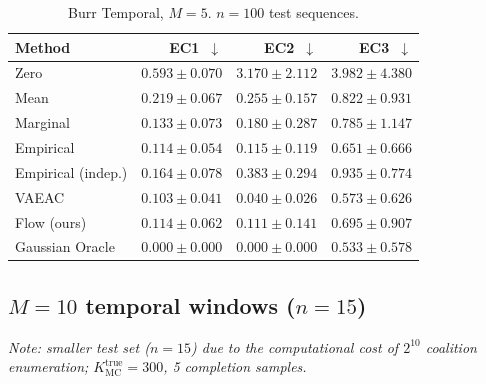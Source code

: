 \documentclass[11pt]{article}
\begin{document}
\begin{table}[h]
\centering
\caption{Burr Temporal, $M=5$. $n=100$ test sequences.}
\label{tab:burr_m5}
\begin{tabular}{lrrr}
\toprule
Method               & EC1~$\downarrow$           & EC2~$\downarrow$           & EC3~$\downarrow$ \\
\midrule
Zero                 & $0.593 \pm 0.070$          & $3.170 \pm 2.112$          & $3.982 \pm 4.380$ \\
Mean                 & $0.219 \pm 0.067$          & $0.255 \pm 0.157$          & $0.822 \pm 0.931$ \\
Marginal             & $0.133 \pm 0.073$          & $0.180 \pm 0.287$          & $0.785 \pm 1.147$ \\
Empirical            & $0.114 \pm 0.054$          & $0.115 \pm 0.119$          & $0.651 \pm 0.666$ \\
Empirical (indep.)   & $0.164 \pm 0.078$          & $0.383 \pm 0.294$          & $0.935 \pm 0.774$ \\
VAEAC                & $\mathbf{0.103 \pm 0.041}$ & $\mathbf{0.040 \pm 0.026}$ & $\mathbf{0.573 \pm 0.626}$ \\
Flow (ours)          & $0.114 \pm 0.062$          & $0.111 \pm 0.141$          & $0.695 \pm 0.907$ \\
\midrule
Gaussian Oracle      & $0.000 \pm 0.000$          & $0.000 \pm 0.000$          & $0.533 \pm 0.578$ \\
\bottomrule
\end{tabular}
\end{table}

\subsection{$M = 10$ temporal windows \quad ($n = 15$)}

\noindent
\textit{Note: smaller test set ($n=15$) due to the computational cost of $2^{10}$
coalition enumeration; $K_\mathrm{MC}^\mathrm{true}=300$, 5 completion samples.}
\end{document}
